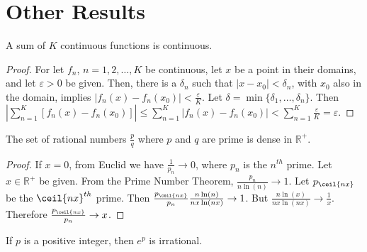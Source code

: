     \section{Other Results}
        \begin{theorem}
            A sum of $K$ continuous functions is continuous. 
        \end{theorem}
        \begin{proof}
            For let $f_n$, $n=1,2,\hdots,K$ be continuous,
            let $x$ be a point in their domains, and let
            $\varepsilon>0$ be given. Then, there is a
            $\delta_n$ such that $|x-x_0|<\delta_n$, with
            $x_0$ also in the domain, implies
            $|f_n(x)-f_n(x_0)|<\frac{\varepsilon}{K}$.
            Let $\delta=\min\{\delta_1,\hdots,\delta_n\}$. Then
            $|\sum_{n=1}^{K}[f_n(x)-f_n(x_0)]|\leq%
              \sum_{n=1}^{K}|f_n(x)-f_n(x_0)|<%
              \sum_{n=1}^{K}\frac{\varepsilon}{K}=\varepsilon$.
        \end{proof}
        \begin{theorem}
            The set of rational numbers $\frac{p}{q}$ where $p$
            and $q$ are prime is dense in $\mathbb{R}^{+}$.
        \end{theorem}
        \begin{proof}
            If $x=0$, from Euclid we have
            $\frac{1}{p_n}\rightarrow 0$,
            where $p_n$ is the $n^{th}$ prime. Let
            $x\in\mathbb{R}^{+}$ be given. From the Prime Number
            Theorem, $\frac{p_n}{n\ln(n)}\rightarrow 1$. Let
            $p_{\ceil{nx}}$ be the $\ceil{nx}^{th}$ prime. Then
            $\frac{p_{\ceil{nx}}}{p_n}\frac{n\ln(n)}{nx\ln(nx)}
            \rightarrow 1$. But
            $\frac{n\ln(x)}{nx\ln(nx)}\rightarrow \frac{1}{x}$.
            Therefore $\frac{p_{\ceil{nx}}}{p_n}\rightarrow x$.
        \end{proof}
        \begin{theorem}
            If $p$ is a positive integer, then
            $e^{p}$ is irrational.
        \end{theorem}

